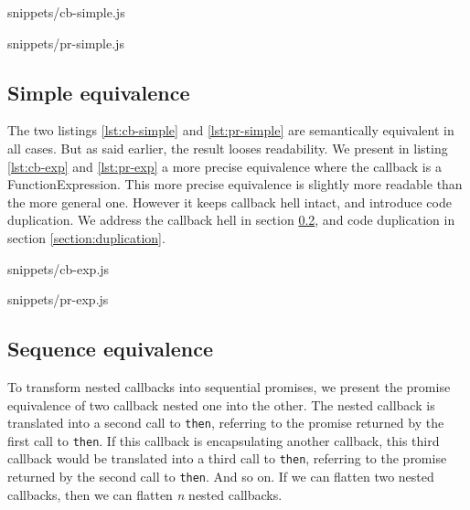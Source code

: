              {snippets/cb-simple.js}

             {snippets/pr-simple.js}

\subsection{Simple equivalence} \label{section:simple}

The two listings \ref{lst:cb-simple} and \ref{lst:pr-simple} are semantically equivalent in all cases.
But as said earlier, the result looses readability.
We present in listing \ref{lst:cb-exp} and \ref{lst:pr-exp} a more precise equivalence where the callback is a FunctionExpression.
This more precise equivalence is slightly more readable than the more general one.
However it keeps callback hell intact, and introduce code duplication.
We address the callback hell in section \ref{section:sequence}, and code duplication in section \ref{section:duplication}.

             {snippets/cb-exp.js}

             {snippets/pr-exp.js}


\subsection{Sequence equivalence} \label{section:sequence}

To transform nested callbacks into sequential promises, we present the promise equivalence of two callback nested one into the other.
The nested callback is translated into a second call to \texttt{then}, referring to the promise returned by the first call to \texttt{then}.
If this callback is encapsulating another callback, this third callback would be translated into a third call to \texttt{then}, referring to the promise returned by the second call to \texttt{then}.
And so on.
If we can flatten two nested callbacks, then we can flatten \textit{n} nested callbacks.

